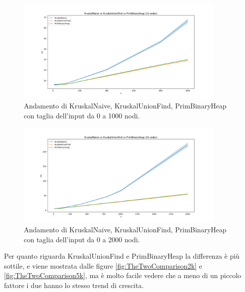 \begin{figure}[H]
    \centering
    \includegraphics[width=0.9\textwidth]{./images/KruskalNaive_vs_KruskalUnionFind_vs_PrimBinaryHeap_(1k_nodes).png}
    \caption{Andamento di KruskalNaive, KruskalUnionFind, PrimBinaryHeap con taglia dell'input da 0 a 1000 nodi.}
    \label{fig:TheThreeComparison1k}
\end{figure}

\begin{figure}[H]
    \centering
    \includegraphics[width=0.9\textwidth]{./images/KruskalNaive_vs_KruskalUnionFind_vs_PrimBinaryHeap_(2k_nodes).png}
    \caption{Andamento di KruskalNaive, KruskalUnionFind, PrimBinaryHeap con taglia dell'input da 0 a 2000 nodi.}
    \label{fig:TheThreeComparison2k}
\end{figure}

\noindent Per quanto riguarda KruskalUnionFind e PrimBinaryHeap la differenza è più sottile,
e viene mostrata dalle figure \ref{fig:TheTwoComparison2k} e \ref{fig:TheTwoComparison5k}, ma è molto facile
vedere che a meno di un piccolo fattore i due hanno lo stesso trend di crescita.

